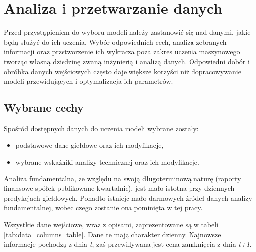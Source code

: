 \documentclass[a4paper, twoside, 11pt, openright]{article}
\begin{document}
\newpage

\section{Analiza i przetwarzanie danych}

Przed przystąpieniem do wyboru modeli należy zastanowić się nad danymi, jakie będą służyć do ich uczenia. Wybór odpowiednich cech, analiza zebranych informacji oraz przetworzenie ich wykracza poza zakres uczenia maszynowego tworząc własną dziedzinę zwaną inżynierią i analizą danych. Odpowiedni dobór i obróbka danych wejściowych często daje większe korzyści niż dopracowywanie modeli przewidujących i optymalizacja ich parametrów. 

\subsection{Wybrane cechy}

Spośród dostępnych danych do uczenia modeli wybrane zostały: 
\begin{itemize}
\item podstawowe dane giełdowe oraz ich modyfikacje,
\item wybrane wskaźniki analizy technicznej oraz ich modyfikacje.
\end{itemize}

Analiza fundamentalna, ze względu na swoją długoterminową naturę (raporty finansowe spółek publikowane kwartalnie), jest mało istotna przy dziennych predykcjach giełdowych. Ponadto istnieje mało darmowych źródeł danych analizy fundamentalnej, wobec czego zostanie ona pominięta w tej pracy.

\bigskip

Wszystkie dane wejściowe, wraz z opisami, zaprezentowane są w tabeli \ref{tab:data_columns_table}. Dane te mają charakter dzienny. Najnowsze informacje pochodzą z dnia \textit{t}, zaś przewidywana jest cena zamknięcia z dnia \textit{t+1}.
\end{document}
